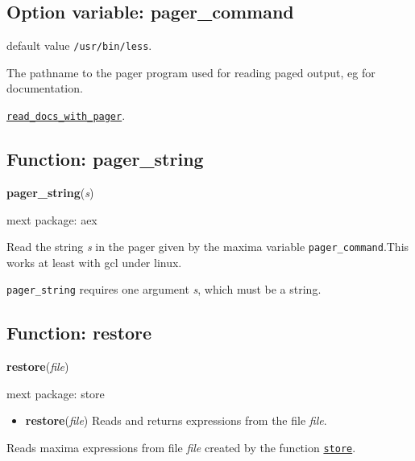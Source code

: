 \documentclass[]{article}
\begin{document}
\subsection{Option variable: pager\_command\label{sec:pager_command}}
\hypertarget{pager_command}{}



\vspace{5 pt}
  default value \verb#/usr/bin/less#.

The pathname to the pager program used for reading paged output, eg for documentation. 

\vspace{5 pt}


 \hyperlink{read_docs_with_pager}{{\tt read\_docs\_with\_pager}}.

\vspace{5 pt}


\subsection{Function: pager\_string\label{sec:pager_string}}
\hypertarget{pager_string}{}
{\bf pager\_string}({\it s})


\noindent mext package: aex



\vspace{5 pt}
Read the string {\it s} in the pager given by the maxima variable \verb#pager_command#.This works at least with gcl under linux. 

\vspace{5 pt}

   {\tt pager\_string} requires one argument {\it s}, which must be a string.


\vspace{5 pt}


\subsection{Function: restore\label{sec:restore}}
\hypertarget{restore}{}
{\bf restore}({\it file})


\noindent mext package: store



\vspace{5 pt}
\begin{itemize}
\item[] {\bf restore}({\it file})
  Reads and returns expressions from the file {\it file}. 

\end{itemize}
Reads maxima expressions from file {\it file} created by the function \hyperlink{store}{{\tt store}}. 
\end{document}
